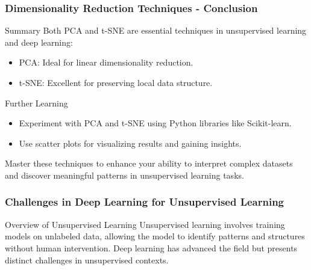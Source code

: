 \documentclass[aspectratio=169]{beamer}
\begin{document}
\begin{frame}[fragile]
    \frametitle{Dimensionality Reduction Techniques - Conclusion}
    
    \begin{block}{Summary}
        Both PCA and t-SNE are essential techniques in unsupervised learning and deep learning:
        \begin{itemize}
            \item PCA: Ideal for linear dimensionality reduction.
            \item t-SNE: Excellent for preserving local data structure.
        \end{itemize}
    \end{block}

    \begin{block}{Further Learning}
        \begin{itemize}
            \item Experiment with PCA and t-SNE using Python libraries like Scikit-learn.
            \item Use scatter plots for visualizing results and gaining insights.
        \end{itemize}
    \end{block}

    Master these techniques to enhance your ability to interpret complex datasets and discover meaningful patterns in unsupervised learning tasks.
\end{frame}

\begin{frame}[fragile]
    \frametitle{Challenges in Deep Learning for Unsupervised Learning}
    
    \begin{block}{Overview of Unsupervised Learning}
        Unsupervised learning involves training models on unlabeled data, allowing the model to identify patterns and structures without human intervention. Deep learning has advanced the field but presents distinct challenges in unsupervised contexts.
    \end{block}
\end{frame}
\end{document}
